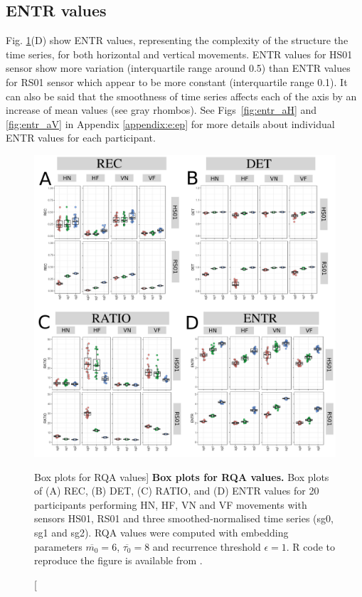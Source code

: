 \subsection*{ENTR values}
Fig. \ref{fig:RQABP}(D) show ENTR values, representing the complexity of 
the structure the time series, for both horizontal and vertical movements.
ENTR values for HS01 sensor show more variation 
(interquartile range around 0.5)
than ENTR values for RS01 sensor which appear 
to be more constant (interquartile range 0.1).
It can also be said that the smoothness of time series affects
each of the axis by an increase of mean values (see gray rhombos).
See Figs~\ref{fig:entr_aH} and \ref{fig:entr_aV} in Appendix
\ref{appendix:e:ep}
for more details about individual ENTR values for each participant.

\begin{figure}
\centering
\includegraphics[width=1.0\textwidth]{fig_6_08}
    \caption
	[Box plots for RQA values]{
	{\bf Box plots for RQA values.}
	Box plots of (A) REC, (B) DET, (C) RATIO, and (D) ENTR values 
	for 20 participants performing HN, HF, VN and VF movements
	with sensors HS01, RS01 and three smoothed-normalised  
	time series (sg0, sg1 and sg2).
	RQA values were computed with 
	embedding parameters $\overline{m_0}=6$, $\overline{\tau_0}=8$ and
	recurrence threshold $\epsilon=1$.
	R code to reproduce the figure is available from \cite{xochicale2018}.
        }
    \label{fig:RQABP}
\end{figure}

